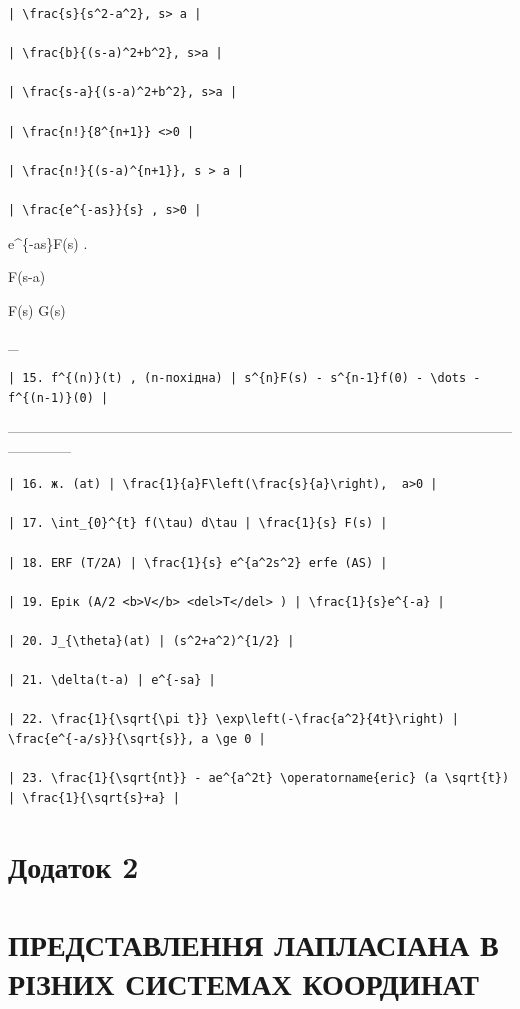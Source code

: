 \documentclass[
]{article}
\begin{document}
{{{{\begin{verbatim}
| \frac{s}{s^2-a^2}, s> a |

| \frac{b}{(s-a)^2+b^2}, s>a |

| \frac{s-a}{(s-a)^2+b^2}, s>a |

| \frac{n!}{8^{n+1}} <>0 |

| \frac{n!}{(s-a)^{n+1}}, s > a |

| \frac{e^{-as}}{s} , s>0 |
\end{verbatim}

e\^{}\{-as\}F(s) . \textbar{}

F(s-a) \textbar{}

F(s) G(s) \textbar{}

\_ \textbar{}

\begin{verbatim}
| 15. f^{(n)}(t) , (n-похідна) | s^{n}F(s) - s^{n-1}f(0) - \dots - f^{(n-1)}(0) |
\end{verbatim}

\textbar------------------------------------------------------------------------\textbar--------------------------------------------------\textbar{}

\begin{verbatim}
| 16. ж. (at) | \frac{1}{a}F\left(\frac{s}{a}\right),  a>0 |

| 17. \int_{0}^{t} f(\tau) d\tau | \frac{1}{s} F(s) |

| 18. ERF (T/2A) | \frac{1}{s} e^{a^2s^2} erfe (AS) |

| 19. Ерік (A/2 <b>V</b> <del>T</del> ) | \frac{1}{s}e^{-a} |

| 20. J_{\theta}(at) | (s^2+a^2)^{1/2} |

| 21. \delta(t-a) | e^{-sa} |

| 22. \frac{1}{\sqrt{\pi t}} \exp\left(-\frac{a^2}{4t}\right) | \frac{e^{-a/s}}{\sqrt{s}}, a \ge 0 |

| 23. \frac{1}{\sqrt{nt}} - ae^{a^2t} \operatorname{eric} (a \sqrt{t}) | \frac{1}{\sqrt{s}+a} |
\end{verbatim}

\section{Додаток 2}\label{ux434ux43eux434ux430ux442ux43eux43a-2}

\section{ПРЕДСТАВЛЕННЯ ЛАПЛАСІАНА В РІЗНИХ СИСТЕМАХ
КООРДИНАТ}\label{ux43fux440ux435ux434ux441ux442ux430ux432ux43bux435ux43dux43dux44f-ux43bux430ux43fux43bux430ux441ux456ux430ux43dux430-ux432-ux440ux456ux437ux43dux438ux445-ux441ux438ux441ux442ux435ux43cux430ux445-ux43aux43eux43eux440ux434ux438ux43dux430ux442}

}}}}
\end{document}
